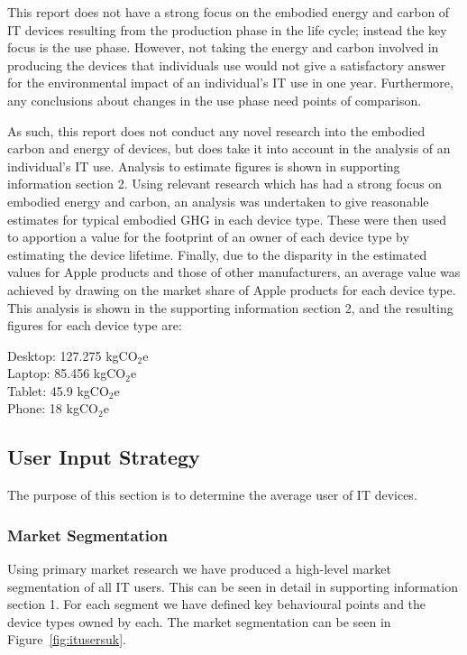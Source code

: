 \documentclass[conference]{IEEEtran}
\begin{document}
This report does not have a strong focus on the embodied energy and
carbon of IT devices resulting from the production phase in the life
cycle; instead the key focus is the use phase. However, not taking the
energy and carbon involved in producing the devices that individuals
use would not give a satisfactory answer for the environmental impact
of an individual's IT use in one year. Furthermore, any conclusions
about changes in the use phase need points of comparison.

As such, this report does not conduct any novel research into the
embodied carbon and energy of devices, but does take it into account
in the analysis of an individual’s IT use. Analysis to estimate
figures is shown in supporting information section 2. Using relevant
research which has had a strong focus on embodied energy and carbon,
an analysis was undertaken to give reasonable estimates for typical
embodied GHG in each device type. These were then used to apportion a
value for the footprint of an owner of each device type by estimating
the device lifetime. Finally, due to the disparity in the estimated
values for Apple products and those of other manufacturers, an average
value was achieved by drawing on the market share of Apple products
for each device type. This analysis is shown in the supporting
information section 2, and the resulting figures for each device type
are:

Desktop: 127.275 kgCO$_2$e\\
Laptop: 85.456 kgCO$_2$e\\
Tablet: 45.9 kgCO$_2$e\\
Phone: 18 kgCO$_2$e\\

\subsection{User Input Strategy}

The purpose of this section is to determine the average user of IT
devices.

\subsubsection{Market Segmentation}

Using primary market research we have produced a high-level market
segmentation of all IT users. This can be seen in detail in supporting
information section 1. For each segment we have defined key
behavioural points and the device types owned by each. The market
segmentation can be seen in Figure~\ref{fig:itusersuk}.
\end{document}
